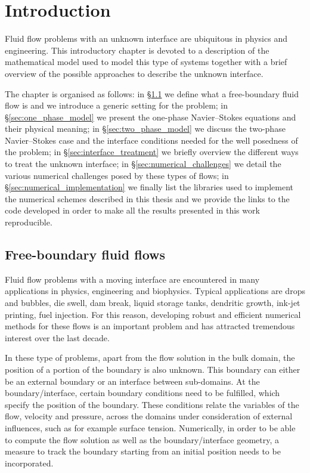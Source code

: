 \chapter{\sc Introduction}\label{ch:introduction}
Fluid flow problems with an unknown interface are ubiquitous in physics and
engineering. This introductory chapter is devoted to a description of the
mathematical model used to model this type of systems together with a brief
overview of the possible approaches to describe the unknown interface.

The chapter is organised as follows: in \S\ref{sec:free_boundary_flows}
we define what a free-boundary fluid flow is and we introduce a generic setting
for the problem; in \S\ref{sec:one_phase_model} we present the one-phase
Navier--Stokes equations and their physical meaning; in
\S\ref{sec:two_phase_model} we discuss the two-phase Navier--Stokes case
and the interface conditions needed for the well posedness of the problem;
in \S\ref{sec:interface_treatment} we briefly overview the different ways to
treat the unknown interface; in \S\ref{sec:numerical_challenges} we detail
the various numerical challenges posed by these types of flows; in
\S\ref{sec:numerical_implementation} we finally list the libraries used to
implement the numerical schemes described in this thesis and we provide the
links to the code developed in order to make all the results presented in this
work reproducible.

\section{Free-boundary fluid flows}\label{sec:free_boundary_flows}
Fluid flow problems with a moving interface are encountered in many
applications in physics, engineering and biophysics. Typical applications are
drops and bubbles, die swell, dam break, liquid storage tanks, dendritic growth,
ink-jet printing, fuel injection. For this reason, developing robust and
efficient numerical methods for these flows is an important problem and
has attracted tremendous interest over the last decade.

In these type of problems, apart from the flow solution in the bulk domain, the
position of a portion of the boundary is also unknown. This boundary can either
be an external boundary or an interface between sub-domains. At the
boundary/interface, certain boundary conditions need to be fulfilled, which
specify the position of the boundary. These conditions relate the variables of
the flow, velocity and pressure, across the domains under consideration of
external influences, such as for example surface tension. Numerically, in order
to be able to compute the flow solution as well as the boundary/interface
geometry, a measure to track the boundary starting from an initial position
needs to be incorporated.

